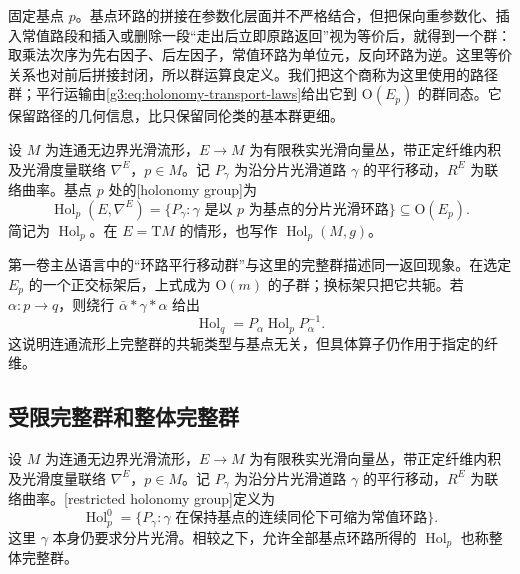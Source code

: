 \ProseParagraphBreak

固定基点 \(p\)。基点环路的拼接在参数化层面并不严格结合，但把保向重参数化、插入常值路段和插入或删除一段“走出后立即原路返回”视为等价后，就得到一个群：取乘法次序为先右因子、后左因子，常值环路为单位元，反向环路为逆。这里等价关系也对前后拼接封闭，所以群运算良定义。我们把这个商称为这里使用的路径群；平行运输由\eqref{g3:eq:holonomy-transport-laws}给出它到 \(\mathrm O(E_p)\) 的群同态。它保留路径的几何信息，比只保留同伦类的基本群更细。

\begin{definition}\label{g3:def:holonomy-group}
	设 \(M\) 为连通无边界光滑流形，\(E\to M\) 为有限秩实光滑向量丛，带正定纤维内积及光滑度量联络 \(\nabla^E\)，\(p\in M\)。记 \(P_\gamma\) 为沿分片光滑道路 \(\gamma\) 的平行移动，\(R^E\) 为联络曲率。基点 \(p\) 处的[holonomy group]为
	\begin{equation}\label{g3:eq:holonomy-group}
		\operatorname{Hol}_p(E,\nabla^E)
		=\{P_\gamma:\gamma\text{ 是以 }p\text{ 为基点的分片光滑环路}\}
		\subseteq\mathrm O(E_p).
	\end{equation}
	简记为 \(\operatorname{Hol}_p\)。在 \(E=\mathrm TM\) 的情形，也写作 \(\operatorname{Hol}_p(M,g)\)。
\end{definition}

第一卷主丛语言中的“环路平行移动群”与这里的完整群描述同一返回现象。在选定 \(E_p\) 的一个正交标架后，上式成为 \(\mathrm O(m)\) 的子群；换标架只把它共轭。若 \(\alpha:p\to q\)，则绕行 \(\bar\alpha*\gamma*\alpha\) 给出
\begin{equation}\label{g3:eq:holonomy-basepoint-change}
	\operatorname{Hol}_q=P_\alpha\operatorname{Hol}_pP_\alpha^{-1}.
\end{equation}
这说明连通流形上完整群的共轭类型与基点无关，但具体算子仍作用于指定的纤维。

\subsection{受限完整群和整体完整群}
\label{g3:subsec:0501:02}

\begin{definition}\label{g3:def:restricted-holonomy}
	设 \(M\) 为连通无边界光滑流形，\(E\to M\) 为有限秩实光滑向量丛，带正定纤维内积及光滑度量联络 \(\nabla^E\)，\(p\in M\)。记 \(P_\gamma\) 为沿分片光滑道路 \(\gamma\) 的平行移动，\(R^E\) 为联络曲率。[restricted holonomy group]定义为
	\[
		\operatorname{Hol}_p^0
		=\{P_\gamma:\gamma\text{ 在保持基点的连续同伦下可缩为常值环路}\}.
	\]
	这里 \(\gamma\) 本身仍要求分片光滑。相较之下，允许全部基点环路所得的 \(\operatorname{Hol}_p\) 也称整体完整群。
\end{definition}

